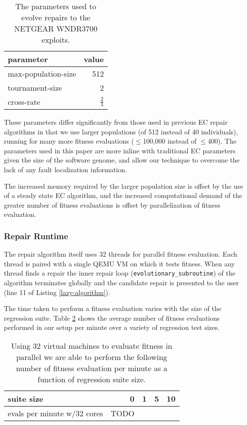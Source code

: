\documentclass{sigcomm-alternate}
\begin{document}
\begin{table}[htb]
\centering
\begin{tabular}{lr}
parameter & value\\
\hline
max-population-size & 512\\
tournament-size & 2\\
cross-rate & $\frac{2}{3}$\\
\end{tabular}\caption{\label{parameters}The parameters used to evolve repairs to the NETGEAR WNDR3700 exploits.}

\end{table}

These parameters differ significantly from those used in previous EC
repair algorithms \cite{forrest2009genetic,legoues2011systematicstudy,le2012representations} in that we
use larger populations (of 512 instead of 40 individuals), running for
many more fitness evaluations ($\leq$100,000 instead of $\leq$400).  The
parameters used in this paper are more inline with traditional EC
parameters given the size of the software genome, and allow our
technique to overcome the lack of any fault localization information.

The increased memory required by the larger population size is offset
by the use of a steady state EC algorithm, and the increased
computational demand of the greater number of fitness evaluations is
offset by parallelization of fitness evaluation.
\subsubsection{Repair Runtime}
\label{sec-4-1-2}
The repair algorithm itself uses 32 threads for parallel fitness
evaluation.  Each thread is paired with a single QEMU VM on which it
tests fitness.  When any thread finds a repair the inner repair loop
(\texttt{evolutionary\_subroutine}) of the algorithm terminates globally and
the candidate repair is presented to the user (line 11 of Listing
\ref{lazy-algorithm}).

The time taken to perform a fitness evaluation varies with the size of
the regression suite.  Table \ref{test-speed} shows the average number of
fitness evaluations performed in our setup per minute over a variety
of regression test sizes.

\begin{table}[htb]
\centering
\begin{tabular}{lrrrr}
suite size & 0 & 1 & 5 & 10\\
\hline
evals per minute w/32 cores & TODO &  &  & \\
\end{tabular}\caption{\label{test-speed}Using 32 virtual machines to evaluate fitness in parallel we are able to perform the following number of fitness evaluation per minute as a function of regression suite size.}

\end{table}
\end{document}

